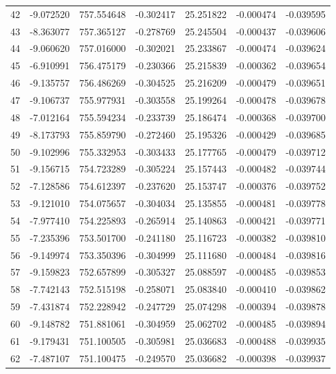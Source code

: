 \begin{tabular}{rrrrrrr}
  42 &  -9.072520 &  757.554648 & -0.302417 &  25.251822 &  -0.000474 & -0.039595 \\
  43 &  -8.363077 &  757.365127 & -0.278769 &  25.245504 &  -0.000437 & -0.039606 \\
  44 &  -9.060620 &  757.016000 & -0.302021 &  25.233867 &  -0.000474 & -0.039624 \\
  45 &  -6.910991 &  756.475179 & -0.230366 &  25.215839 &  -0.000362 & -0.039654 \\
  46 &  -9.135757 &  756.486269 & -0.304525 &  25.216209 &  -0.000479 & -0.039651 \\
  47 &  -9.106737 &  755.977931 & -0.303558 &  25.199264 &  -0.000478 & -0.039678 \\
  48 &  -7.012164 &  755.594234 & -0.233739 &  25.186474 &  -0.000368 & -0.039700 \\
  49 &  -8.173793 &  755.859790 & -0.272460 &  25.195326 &  -0.000429 & -0.039685 \\
  50 &  -9.102996 &  755.332953 & -0.303433 &  25.177765 &  -0.000479 & -0.039712 \\
  51 &  -9.156715 &  754.723289 & -0.305224 &  25.157443 &  -0.000482 & -0.039744 \\
  52 &  -7.128586 &  754.612397 & -0.237620 &  25.153747 &  -0.000376 & -0.039752 \\
  53 &  -9.121010 &  754.075657 & -0.304034 &  25.135855 &  -0.000481 & -0.039778 \\
  54 &  -7.977410 &  754.225893 & -0.265914 &  25.140863 &  -0.000421 & -0.039771 \\
  55 &  -7.235396 &  753.501700 & -0.241180 &  25.116723 &  -0.000382 & -0.039810 \\
  56 &  -9.149974 &  753.350396 & -0.304999 &  25.111680 &  -0.000484 & -0.039816 \\
  57 &  -9.159823 &  752.657899 & -0.305327 &  25.088597 &  -0.000485 & -0.039853 \\
  58 &  -7.742143 &  752.515198 & -0.258071 &  25.083840 &  -0.000410 & -0.039862 \\
  59 &  -7.431874 &  752.228942 & -0.247729 &  25.074298 &  -0.000394 & -0.039878 \\
  60 &  -9.148782 &  751.881061 & -0.304959 &  25.062702 &  -0.000485 & -0.039894 \\
  61 &  -9.179431 &  751.100505 & -0.305981 &  25.036683 &  -0.000488 & -0.039935 \\
  62 &  -7.487107 &  751.100475 & -0.249570 &  25.036682 &  -0.000398 & -0.039937 \\

\end{tabular}
